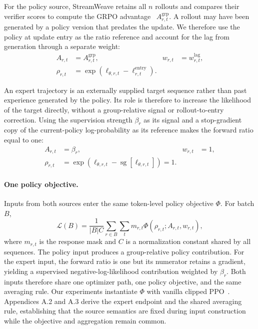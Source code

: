 \documentclass[letterpaper]{article}
\begin{document}
For the policy source, StreamWeave retains all $n$ rollouts and compares their verifier scores to compute the GRPO advantage~\citep{shao2024deepseekmath} $A^{\mathrm{grp}}_{r,t}$.
A rollout may have been generated by a policy version that predates the update.
We therefore use the policy at update entry as the ratio reference and account for the lag from generation through a separate weight:
\begin{equation}
\begin{aligned}
A_{r,t} &= A^{\mathrm{grp}}_{r,t},
& w_{r,t} &= w^{\mathrm{lag}}_{r,t},\\
\rho_{r,t}
&= \exp\!\left(
\ell_{\theta,r,t}-\ell^{\mathrm{entry}}_{r,t}
\right).
\end{aligned}
\label{eq:policy-input}
\end{equation}

An expert trajectory is an externally supplied target sequence rather than past experience generated by the policy.
Its role is therefore to increase the likelihood of the target directly, without a group-relative signal or rollout-to-entry correction.
Using the supervision strength $\beta_r$ as its signal and a stop-gradient copy of the current-policy log-probability as its reference makes the forward ratio equal to one:
\begin{equation}
\begin{aligned}
A_{r,t} &= \beta_r,
& w_{r,t} &= 1,\\
\rho_{r,t}
&= \exp\!\left(
\ell_{\theta,r,t}-\operatorname{sg}[\ell_{\theta,r,t}]
\right)=1.
\end{aligned}
\label{eq:expert-input}
\end{equation}

\paragraph{One policy objective.}
Inputs from both sources enter the same token-level policy objective $\Phi$.
For batch $B$,
\begin{equation}
\mathcal{L}(B)=\frac{1}{|B|C}
\sum_{r\in B}\sum_t m_{r,t}
\Phi\!\left(\rho_{r,t};A_{r,t},w_{r,t}\right),
\label{eq:primary-objective}
\end{equation}
where $m_{r,t}$ is the response mask and $C$ is a normalization constant shared by all sequences.
The policy input produces a group-relative policy contribution.
For the expert input, the forward ratio is one but its numerator retains a gradient, yielding a supervised negative-log-likelihood contribution weighted by $\beta_r$.
Both inputs therefore share one optimizer path, one policy objective, and the same averaging rule.
Our experiments instantiate $\Phi$ with vanilla clipped PPO~\citep{schulman2017ppo}.
Appendices A.2 and A.3 derive the expert endpoint and the shared averaging rule, establishing that the source semantics are fixed during input construction while the objective and aggregation remain common.
\end{document}

